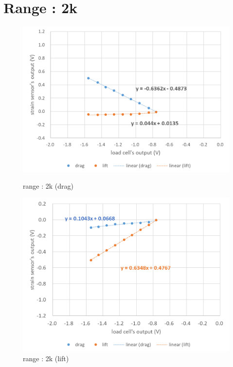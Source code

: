 \documentclass[a4paper]{jsarticle}
\begin{document}
\section{Range : 2k}
\begin{figure}[htbp]
    \footnotesize
    \begin{center}
        \includegraphics[width=130mm]{../images/2k_drag.png}
        \caption{range : 2k (drag)}
        \includegraphics[width=130mm]{../images/2k_lift.png}
        \caption{range : 2k (lift)}
    \end{center}
\end{figure}
\newpage
\end{document}
